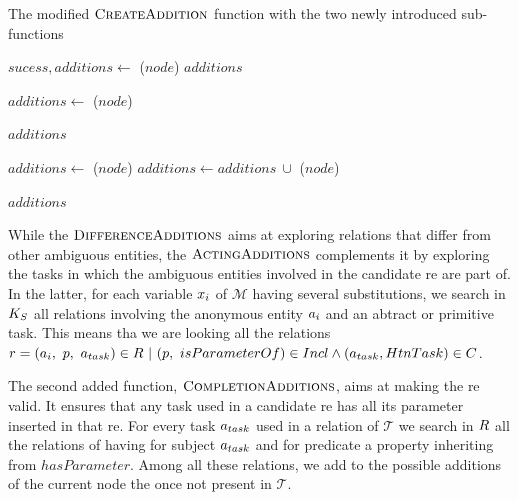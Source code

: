 \begin{algorithm}[htb!]
\caption{\label{alg:chap6_additions} The modified $\textsc{CreateAddition}$ function with the two newly introduced sub-functions}

\begin{algorithmic}

        \State $sucess, additions\leftarrow$ \typingadditions($node$)
            \Return $additions$
        \EndIf
        
        \State $additions\leftarrow$ \completionadditions($node$) 
        
            \Return $additions$
        \EndIf
        
        \State $additions\leftarrow$ \actingadditions($node$) 
        \State $additions\leftarrow additions\ \cup$ \differenceadditions($node$) 
        
        \Return $additions$
    \EndFunction
    
\end{algorithmic}
\end{algorithm}

While the $\textsc{DifferenceAdditions}$ aims at exploring relations that differ from other ambiguous entities, the $\textsc{ActingAdditions}$ complements it by exploring the tasks in which the ambiguous entities involved in the candidate \acrshort{re} are part of. In the latter, for each variable $x_i$ of $\mathcal{M}$ having several substitutions, we search in $K_S$ all relations involving the anonymous entity $a_i$ and an abtract or primitive task. This means tha we are looking all the relations $r = (a_i,\ p,\ a_{task}) \in R\ |\ (p,\ isParameterOf) \in Incl \wedge (a_{task}, HtnTask) \in C$.

The second added function, $\textsc{CompletionAdditions}$, aims at making the \acrshort{re} valid. It ensures that any task used in a candidate \acrshort{re} has all its parameter inserted in that \acrshort{re}. For every task $a_{task}$ used in a relation of $\mathcal{T}$ we search in $R$ all the relations of having for subject $a_{task}$ and for predicate a property inheriting from $hasParameter$. Among all these relations, we add to the possible additions of the current node the once not present in $\mathcal{T}$.

